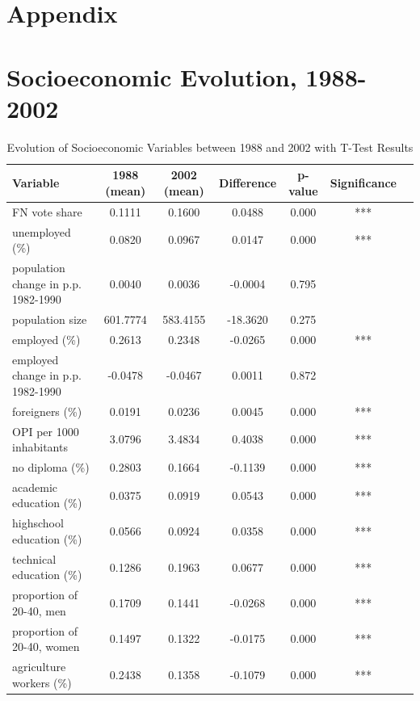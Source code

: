 
\begin{appendices}
\newcommand{\mycomment}[1]{}

\section*{Appendix}

\section{Socioeconomic Evolution, 1988-2002}
\label{app:did}

\begin{table}[ht]
\scriptsize
\centering
\caption{Evolution of Socioeconomic Variables between 1988 and 2002  with T-Test Results}
\label{tab:1988-2002}
\begin{tabular}{lcccccc}
\toprule
Variable & 1988 (mean) & 2002 (mean) & Difference & p-value & Significance \\
\midrule
FN vote share & 0.1111 & 0.1600 & 0.0488 & 0.000 & *** \\
unemployed (\%) & 0.0820 & 0.0967 & 0.0147 & 0.000 & *** \\
population change in p.p. 1982-1990 & 0.0040 & 0.0036 & -0.0004 & 0.795 &  \\
population size & 601.7774 & 583.4155 & -18.3620 & 0.275 &  \\
employed (\%) & 0.2613 & 0.2348 & -0.0265 & 0.000 & *** \\
employed change in p.p. 1982-1990 & -0.0478 & -0.0467 & 0.0011 & 0.872 &  \\
foreigners (\%) & 0.0191 & 0.0236 & 0.0045 & 0.000 & *** \\
OPI per 1000 inhabitants & 3.0796 & 3.4834 & 0.4038 & 0.000 & *** \\
no diploma (\%) & 0.2803 & 0.1664 & -0.1139 & 0.000 & *** \\
academic education (\%) & 0.0375 & 0.0919 & 0.0543 & 0.000 & *** \\
highschool education (\%) & 0.0566 & 0.0924 & 0.0358 & 0.000 & *** \\
technical education (\%) & 0.1286 & 0.1963 & 0.0677 & 0.000 & *** \\
proportion of 20-40, men & 0.1709 & 0.1441 & -0.0268 & 0.000 & *** \\
proportion of 20-40, women & 0.1497 & 0.1322 & -0.0175 & 0.000 & *** \\
agriculture workers (\%) & 0.2438 & 0.1358 & -0.1079 & 0.000 & *** \\

\end{tabular}
\end{table}
\end{appendices}
